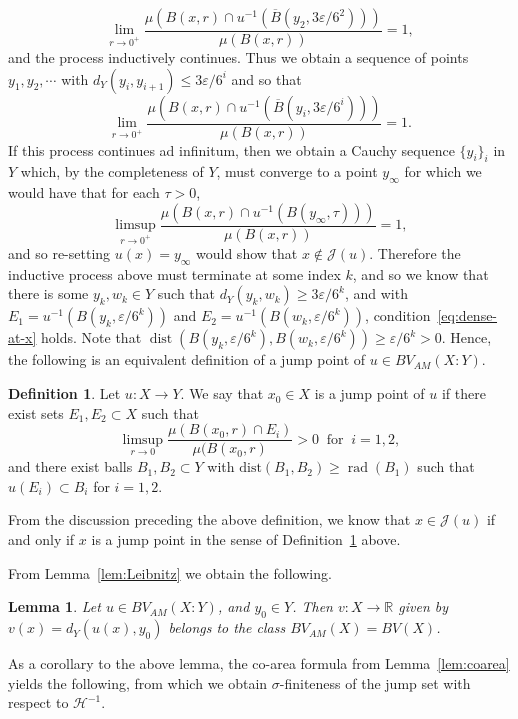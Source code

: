 \documentclass[11pt, letterpaper]{amsart} %
\newcommand*{\R}{{\mathbb R}}
\newcommand*{\eps}{\varepsilon}
\DeclareMathOperator{\dist}{dist}
\DeclareMathOperator{\rad}{rad}
\numberwithin{equation}{section}
\theoremstyle{plain}
\newtheorem{lemma}[equation]{Lemma}
\theoremstyle{definition}
\newtheorem{definition}[equation]{Definition}
\begin{document}
{\[
\lim_{r\to 0^+}\frac{\mu(B(x,r)\cap u^{-1}(\overline{B}(y_2,3\eps/6^2)))}{\mu(B(x,r))}=1,
\]
and the process inductively continues. Thus we obtain a sequence of points $y_1, y_2,\cdots$ with 
$d_Y(y_i,y_{i+1})\le 3\eps/6^i$ and so that
\[
\lim_{r\to 0^+}\frac{\mu(B(x,r)\cap u^{-1}(\overline{B}(y_i,3\eps/6^i)))}{\mu(B(x,r))}=1.
\]
If this process continues ad infinitum, then we obtain a Cauchy sequence $\{y_i\}_i$ in $Y$ which,
by the completeness of $Y$, must converge to a point $y_\infty$ for which we would have that
for each $\tau>0$,
\[
\limsup_{r\to 0^+}\frac{\mu(B(x,r)\cap u^{-1}(B(y_\infty,\tau)))}{\mu(B(x,r))}=1,
\]
and so re-setting $u(x)=y_\infty$ would show that $x\not\in \mathcal{J}(u)$. Therefore the inductive process
above must terminate at some index $k$, and so we know that there is some $y_k, w_k\in Y$ 
such that $d_Y(y_k,w_k)\ge 3\eps/6^k$, and with $E_1=u^{-1}(B(y_k,\eps/6^k))$ and 
$E_2=u^{-1}(B(w_k,\eps/6^k))$, condition~\eqref{eq:dense-at-x} holds. Note that
$\dist(B(y_k,\eps/6^k), B(w_k,\eps/6^k))\ge \eps/6^k>0$.
Hence, the following is an equivalent definition of a jump point of $u\in BV_{AM}(X:Y)$.

\begin{definition}\label{def:jump}
Let $u:X\rightarrow Y$. We say that $x_0\in X$ is a jump point of $u$ if there exist sets $E_1,E_2\subset X$ such that
\begin{equation}\label{eq:jumpdense}
\limsup_{r\to 0}\frac{\mu (B(x_0,r)\cap E_i)}{\mu (B(x_0,r)}>0\ \text{ for }\ i=1,2,
\end{equation}
and there exist balls $B_1,B_2\subset Y$ with $\mathrm{dist}(B_1,B_2)\ge \rad(B_1)$ such that 
$u(E_i)\subset B_i$ for $i=1,2$.
\end{definition}

From the discussion preceding the above definition, we know that $x\in\mathcal{J}(u)$ if and only if
$x$ is a jump point in the sense of Definition~\ref{def:jump} above.

From Lemma~\ref{lem:Leibnitz} we obtain the following.

\begin{lemma}
Let $u\in BV_{AM}(X:Y)$, and $y_0\in Y$. Then $v:X\to\R$ given by $v(x)=d_Y(u(x),y_0)$ belongs to the class 
$BV_{AM}(X)=BV(X)$.
\end{lemma}

As a corollary to the above lemma, the co-area formula from Lemma~\ref{lem:coarea} yields the 
following, from which we obtain $\sigma$-finiteness of the jump set with respect to $\mathcal{H}^{-1}$.

}
\end{document}
